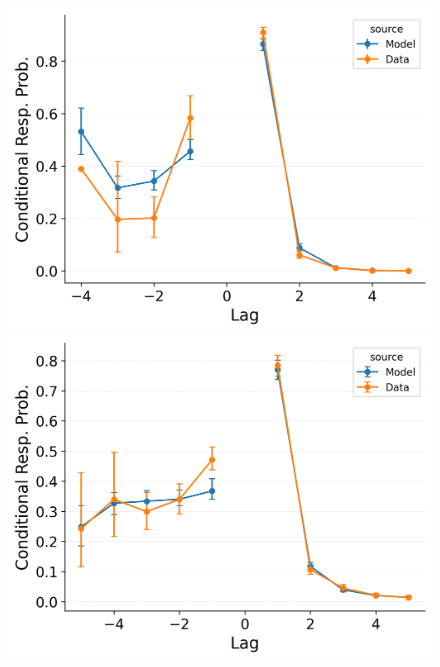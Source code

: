 \documentclass[
  man,
  floatsintext,
  longtable,
  nolmodern,
  notxfonts,
  notimes,
  draftfirst,
  colorlinks=true,linkcolor=blue,citecolor=blue,urlcolor=blue]{apa7}
\begin{document}
\begin{figure}
\begin{minipage}{0.33\linewidth}
\includegraphics{figures/Gordon2021_BaseCMR_Confusable_Fitting_crp_LL5.png}\end{minipage}%
%
\begin{minipage}{0.33\linewidth}
\includegraphics{figures/Gordon2021_BaseCMR_Confusable_Fitting_crp_LL6.png}\end{minipage}%
%
\begin{minipage}{0.33\linewidth}

\end{minipage}
\end{figure}
\end{document}
